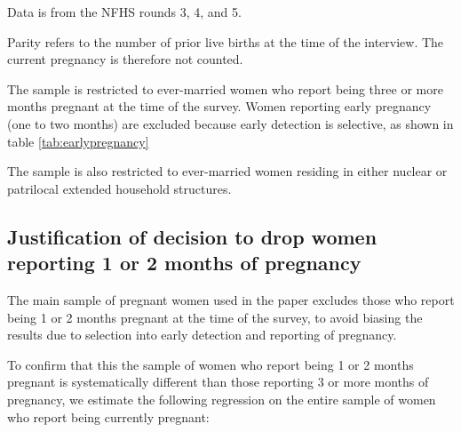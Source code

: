 \documentclass[12pt]{article}
\begin{document}
\begin{landscape}

\begin{table}[H]
    \centering
    \begin{threeparttable}[t]
        \caption{: More than half of the increase in patrilocal extended household residence among pregnant women between 2005-2006 and 2019-2021 can be explained by lower parities in 2019-2021}
        \label{tab:proppatrilocal}

        \scriptsize
        \setlength{\tabcolsep}{6pt}
        \renewcommand{\arraystretch}{1.3}

        

        \begin{tablenotes}
            \item Data is from the NFHS rounds 3, 4, and 5.
            \item Parity refers to the number of prior live births at the time of the interview.  The current pregnancy is therefore not counted.
            \item The sample is restricted to ever-married women who report being three or more months pregnant at the time of the survey. Women reporting early pregnancy (one to two months) are excluded because early detection is selective, as shown in table \ref{tab:earlypregnancy}
            \item The sample is also restricted to ever-married women residing in either nuclear or patrilocal extended household structures. 
        \end{tablenotes}
    \end{threeparttable}
\end{table}

\end{landscape}

\subsection{Justification of decision to drop women reporting 1 or 2 months of 
pregnancy}

The main sample of pregnant women used in the paper excludes those who report being 1 or 2 months pregnant at the time of the survey, 
to avoid biasing the results due to selection into early detection and reporting of pregnancy.

To confirm that this the sample of women who report being 1 or 2 months pregnant is systematically different than those reporting 3 or more months of pregnancy, we estimate the following regression on the entire sample of women who report being currently pregnant:
\end{document}

